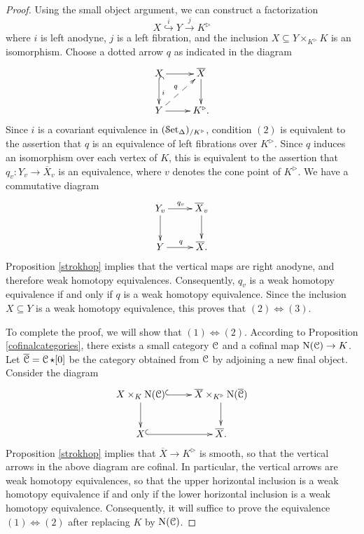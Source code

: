 \begin{proof}
Using the small object argument, we can construct a factorization
$$ X \stackrel{i}{\hookrightarrow} Y \stackrel{j}{\rightarrow} K^{\triangleright} $$
where $i$ is left anodyne, $j$ is a left fibration, and the inclusion
$X \subseteq Y \times_{K^{\triangleright}} K$ is an isomorphism. Choose a dotted arrow
$q$ as indicated in the diagram
$$ \xymatrix{ X \ar@{^{(}->}[d]^{i} \ar[r] & \overline{X} \ar[d] \\
Y \ar[r] \ar@{-->}[ur]^{q} & K^{\triangleright}. }$$
Since $i$ is a covariant equivalence in $(\operatorname{\mathcal{S}et_{\Delta}})_{/K^{\triangleright}}$, condition $(2)$ is equivalent to the assertion that $q$ is an equivalence of left fibrations over $K^{\triangleright}$. Since $q$
induces an isomorphism over each vertex of $K$, this is equivalent to the assertion that
$q_{v}: Y_{v} \rightarrow \overline{X}_{v}$ is an equivalence, where $v$ denotes the cone point
of $K^{\triangleright}$. We have a commutative diagram
$$ \xymatrix{ Y_{v} \ar[r]^{q_v} \ar[d] & \overline{X}_v \ar[d] \\
Y \ar[r]^{q} & \overline{X}. }$$
Proposition \ref{strokhop} implies that the vertical maps are right anodyne, and therefore weak homotopy equivalences. Consequently, $q_{v}$ is a weak homotopy equivalence if and only if $q$ is a weak homotopy equivalence. Since the inclusion $X \subseteq Y$ is a weak homotopy equivalence, this proves that $(2) \Leftrightarrow (3)$.

To complete the proof, we will show that $(1) \Leftrightarrow (2)$.
According to Proposition \ref{cofinalcategories}, there exists a small category $\operatorname{\mathcal{C}}$ and a cofinal map $\operatorname{N}(\operatorname{\mathcal{C}}) \rightarrow K$. Let $\overline{\operatorname{\mathcal{C}}} = \operatorname{\mathcal{C}} \star [0]$ be the category obtained from $\operatorname{\mathcal{C}}$ by adjoining a new final object.
Consider the diagram
$$ \xymatrix{ X \times_{K} \Nerve(\calC) \ar@{^{(}->}[r] \ar[d] & \overline{X} \times_{K^{\triangleright}} \Nerve(\overline{\calC}) \ar[d] \\
X \ar@{^{(}->}[r] & \overline{X}. }$$
Proposition \ref{strokhop} implies that $\overline{X} \rightarrow K^{\triangleright}$ is smooth, so that the vertical arrows in the above diagram are cofinal. In particular, the vertical arrows are weak homotopy equivalences, so that the upper horizontal inclusion is a weak homotopy equivalence
if and only if the lower horizontal inclusion is a weak homotopy equivalence. Consequently, 
it will suffice to prove the equivalence $(1) \Leftrightarrow (2)$ after replacing $K$ by $\operatorname{N} (\operatorname{\mathcal{C}})$.


\end{proof}
